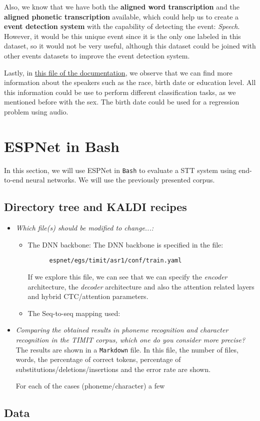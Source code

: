\documentclass[a4paper]{article}
\def\inline{\lstinline[basicstyle=\ttfamily,keywordstyle={}]}
\begin{document}
\begin{itemize}
        Also, we know that we have both the \textbf{aligned word transcription} and the \textbf{aligned phonetic transcription} available, which could help us to create a \textbf{event detection system} with the capability of detecting the event: \emph{Speech}. However, it would be this unique event since it is the only one labeled in this dataset, so it would not be very useful, although this dataset could be joined with other events datasets to improve the event detection system.

        Lastly, in \href{https://catalog.ldc.upenn.edu/docs/LDC93S1/SPKRINFO.TXT}{this file of the documentation}, we observe that we can find more information about the speakers such as the race, birth date or education level. All this information could be use to perform different classification tasks, as we mentioned before with the sex. The birth date could be used for a regression problem using audio.
\end{itemize}

\section{ESPNet in Bash}

In this section, we will use ESPNet in \inline{Bash} to evaluate a STT system using end-to-end neural networks. We will use the previously presented corpus.

\subsection{Directory tree and KALDI recipes}

\begin{itemize}
  \item \emph{Which file(s) should be modified to change...:}\\
        \begin{itemize}
          \item The DNN backbone: The DNN backbone is specified in the file:
                \begin{verbatim}
      espnet/egs/timit/asr1/conf/train.yaml
    \end{verbatim}
                If we explore this file, we can see that we can specify the \emph{encoder} architecture, the \emph{decoder} architecture and also the attention related layers and hybrid CTC/attention parameters.
          \item The Seq-to-seq mapping used:
        \end{itemize}

  \item \emph{Comparing the obtained results in phoneme recognition and character recognition in the TIMIT corpus, which one do you consider more precise?}\\

        The results are shown in a \inline{Markdown} file. In this file, the number of files, words, the percentage of correct tokens, percentage of substitutions/deletions/insertions and the error rate are shown.

        For each of the cases (phoneme/character) a few
\end{itemize}

\subsection{Data}
\end{document}
